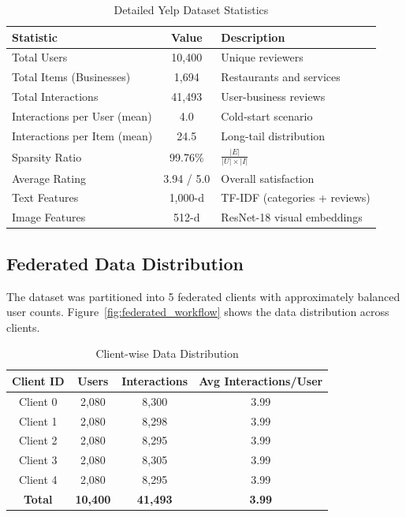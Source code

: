 \documentclass[12pt,a4paper]{report}
\begin{document}
{\begin{table}[htbp]
\centering
\small
\caption{Detailed Yelp Dataset Statistics}
\label{tab:dataset_detailed}
\begin{tabular}{|l|c|l|}
\hline
\textbf{Statistic} & \textbf{Value} & \textbf{Description} \\ \hline
Total Users & 10,400 & Unique reviewers \\ \hline
Total Items (Businesses) & 1,694 & Restaurants and services \\ \hline
Total Interactions & 41,493 & User-business reviews \\ \hline
Interactions per User (mean) & 4.0 & Cold-start scenario \\ \hline
Interactions per Item (mean) & 24.5 & Long-tail distribution \\ \hline
Sparsity Ratio & 99.76\% & $\frac{|E|}{|U|\times|I|}$ \\ \hline
Average Rating & 3.94 / 5.0 & Overall satisfaction \\ \hline
Text Features & 1,000-d & TF-IDF (categories + reviews) \\ \hline
Image Features & 512-d & ResNet-18 visual embeddings \\ \hline
\end{tabular}
\end{table}

\subsection{Federated Data Distribution}
The dataset was partitioned into 5 federated clients with approximately balanced user counts. Figure~\ref{fig:federated_workflow} shows the data distribution across clients.

\begin{table}[htbp]
\centering
\small
\caption{Client-wise Data Distribution}
\label{tab:client_distribution}
\begin{tabular}{|c|c|c|c|}
\hline
\textbf{Client ID} & \textbf{Users} & \textbf{Interactions} & \textbf{Avg Interactions/User} \\ \hline
Client 0 & 2,080 & 8,300 & 3.99 \\ \hline
Client 1 & 2,080 & 8,298 & 3.99 \\ \hline
Client 2 & 2,080 & 8,295 & 3.99 \\ \hline
Client 3 & 2,080 & 8,305 & 3.99 \\ \hline
Client 4 & 2,080 & 8,295 & 3.99 \\ \hline
\textbf{Total} & \textbf{10,400} & \textbf{41,493} & \textbf{3.99} \\ \hline
\end{tabular}
\end{table}

}
\end{document}
